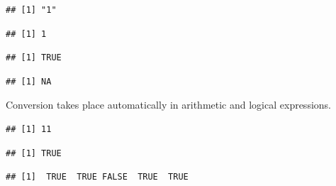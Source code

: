 \documentclass[krantz2]{krantz}\usepackage{knitr}%
\begin{document}
\begin{knitrout}\footnotesize
{}\color{fgcolor}\begin{kframe}
\begin{alltt}
\hlstd{(}\hlstd{)}
\end{alltt}
\begin{verbatim}
## [1] "1"
\end{verbatim}
\begin{alltt}
\hlstd{(}\hlstd{)}
\end{alltt}
\begin{verbatim}
## [1] 1
\end{verbatim}
\begin{alltt}
\hlstd{(}\hlstd{)}
\end{alltt}
\begin{verbatim}
## [1] TRUE
\end{verbatim}
\begin{alltt}
\hlstd{(}\hlstd{)}
\end{alltt}
\begin{verbatim}
## [1] NA
\end{verbatim}
\end{kframe}
\end{knitrout}

Conversion takes place automatically in arithmetic and logical expressions.

\begin{knitrout}\footnotesize
{}\color{fgcolor}\begin{kframe}
\begin{alltt}
 \hlopt{+} 
\end{alltt}
\begin{verbatim}
## [1] 11
\end{verbatim}
\begin{alltt}
 \hlopt{||} 
\end{alltt}
\begin{verbatim}
## [1] TRUE
\end{verbatim}
\begin{alltt}
 \hlopt{| -}\hlopt{:}
\end{alltt}
\begin{verbatim}
## [1]  TRUE  TRUE FALSE  TRUE  TRUE
\end{verbatim}
\end{kframe}
\end{knitrout}
\end{document}
